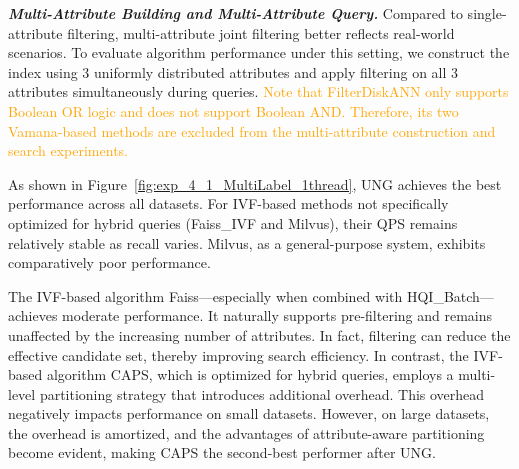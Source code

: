 \documentclass[sigconf, nonacm]{acmart}
\begin{document}
	
	
	
	
	\textit{\textbf{Multi-Attribute Building and Multi-Attribute Query.}}  
	Compared to single-attribute filtering, multi-attribute joint filtering better reflects real-world scenarios. To evaluate algorithm performance under this setting, we construct the index using 3 uniformly distributed attributes and apply filtering on all 3 attributes simultaneously during queries. \textcolor{orange}{Note that FilterDiskANN only supports Boolean OR logic and does not support Boolean AND. Therefore, its two Vamana-based methods are excluded from the multi-attribute construction and search experiments.}
	
	As shown in Figure~\ref{fig:exp_4_1_MultiLabel_1thread}, UNG achieves the best performance across all datasets. For IVF-based methods not specifically optimized for hybrid queries (Faiss\_IVF and Milvus), their QPS remains relatively stable as recall varies. Milvus, as a general-purpose system, exhibits comparatively poor performance. 
	

		The IVF-based algorithm Faiss---especially when combined with HQI\_Batch---achieves moderate performance. It naturally supports pre-filtering and remains unaffected by the increasing number of attributes. In fact, filtering can reduce the effective candidate set, thereby improving search efficiency. In contrast, the IVF-based algorithm CAPS, which is optimized for hybrid queries, employs a multi-level partitioning strategy that introduces additional overhead. This overhead negatively impacts performance on small datasets. However, on large datasets, the overhead is amortized, and the advantages of attribute-aware partitioning become evident, making CAPS the second-best performer after UNG.
	
	
	
\end{document}
